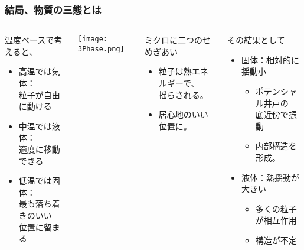 \documentclass[12pt, dvipdfmx]{beamer}
\begin{document}
\begin{frame}
	\frametitle{結局、物質の三態とは}
		\begin{columns}[T, onlytextwidth]
				\begin{block}{温度ベースで考えると、}
					\begin{itemize}
						\item 高温では気体：\\
						粒子が自由に動ける
						\item 中温では液体：\\
						適度に移動できる
						\item 低温では固体：\\
						最も落ち着きのいい\\位置に留まる
					\end{itemize}
				\end{block}
					\begin{center}
						\texttt{[image: 3Phase.png]}
					\end{center}
				\begin{exampleblock}{ミクロに二つのせめぎあい}
					\begin{itemize}
						\item 粒子は熱エネルギーで、\\揺らされる。
						\item 居心地のいい位置に。
					\end{itemize}
				\end{exampleblock}
				\vspace{-2mm}
				\begin{alertblock}{その結果として}
					\begin{itemize}
						\item 固体：相対的に揺動小
						\begin{itemize}
							\item ポテンシャル井戸の\\底近傍で振動
							\item 内部構造を形成。
						\end{itemize}
						\item 液体：熱揺動が大きい
						\begin{itemize}
							\item 多くの粒子が相互作用
							\item 構造が不定
						\end{itemize}
					\end{itemize}
				\end{alertblock}
		\end{columns}	
\end{frame}
\end{document}
